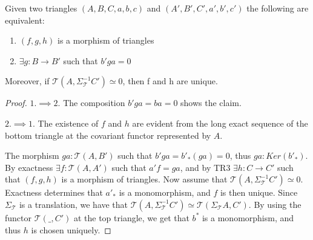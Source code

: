     \begin{lemma}
        Given two triangles $(A,B,C,a,b,c)$ and $(A',B',C',a',b',c')$ the following are equivalent:
        \begin{center}
            \begin{minipage}[c]{0.4\textwidth}
            \end{minipage}
            \begin{minipage}[c]{0.5\textwidth}
                \begin{enumerate}
                    \item $(f,g,h)$ is a morphism of triangles
                    \item $\exists g:B\rightarrow B'$ such that $b'ga = 0$
                \end{enumerate}
            \end{minipage}
        \end{center}
        Moreover, if $\mathcal{T}(A,\Sigma_{\mathcal{T}}^{-1}C')\simeq 0$, then f and h are unique.
    \end{lemma}

    \begin{proof}
        $1. \implies 2.$ The composition $b'ga = ba = 0$ shows the claim. 
        
        $2. \implies 1.$ The existence of $f$ and $h$ are  evident from the long exact sequence of the bottom triangle at the covariant functor represented by $A$. 
        \begin{center}
        \end{center}
         The morphism $ga:\mathcal{T}(A,B')$ such that $b'ga=b'_*(ga)=0$, thus $ga:Ker(b'_*)$. By exactness $\exists f:\mathcal{T}(A,A')$ such that $a'f = ga$, and by TR3 $\exists h: C \rightarrow C'$ such that $(f,g,h)$ is a morphism of triangles.
        Now assume that $\mathcal{T}(A,\Sigma_{\mathcal{T}}^{-1}C')\simeq 0$. Exactness determines that $a'_*$ is a monomorphism, and $f$ is then unique. Since $\Sigma_{\mathcal{T}}$ is a translation, we have that $\mathcal{T}(A,\Sigma_{\mathcal{T}}^{-1}C')\simeq\mathcal{T}(\Sigma_{\mathcal{T}}A,C')$. By using the functor $\mathcal{T}(\_,C')$ at the top triangle, we get that $b^*$ is a monomorphism, and thus $h$ is chosen uniquely.
    \end{proof}

